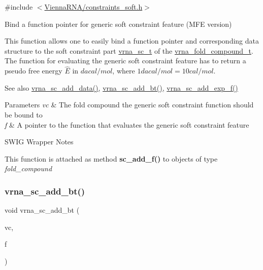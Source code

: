{\ttfamily \#include $<$\mbox{\hyperlink{constraints__soft_8h}{Vienna\+R\+N\+A/constraints\+\_\+soft.\+h}}$>$}



Bind a function pointer for generic soft constraint feature (M\+FE version) 

This function allows one to easily bind a function pointer and corresponding data structure to the soft constraint part \mbox{\hyperlink{group__soft__constraints_ga75401ce219ef8dbcceb672db82d434c6}{vrna\+\_\+sc\+\_\+t}} of the \mbox{\hyperlink{group__fold__compound_ga1b0cef17fd40466cef5968eaeeff6166}{vrna\+\_\+fold\+\_\+compound\+\_\+t}}. The function for evaluating the generic soft constraint feature has to return a pseudo free energy $ \hat{E} $ in $ dacal/mol $, where $ 1 dacal/mol = 10 cal/mol $.

\begin{DoxySeeAlso}{See also}
\mbox{\hyperlink{group__soft__constraints_ga15c6d52471ec97897e2bb7f964f5deb6}{vrna\+\_\+sc\+\_\+add\+\_\+data()}}, \mbox{\hyperlink{group__soft__constraints_gabde7d07a79bb9a8f4721aee247b674ea}{vrna\+\_\+sc\+\_\+add\+\_\+bt()}}, \mbox{\hyperlink{group__soft__constraints_ga87e382b5d0c9b7d9ce1b79c0473ff700}{vrna\+\_\+sc\+\_\+add\+\_\+exp\+\_\+f()}}
\end{DoxySeeAlso}

\begin{DoxyParams}{Parameters}
{\em vc} & The fold compound the generic soft constraint function should be bound to \\
\hline
{\em f} & A pointer to the function that evaluates the generic soft constraint feature\\
\hline
\end{DoxyParams}
\begin{DoxyRefDesc}{S\+W\+I\+G Wrapper Notes}
\item[\mbox{\hyperlink{wrappers__wrappers000022}{S\+W\+I\+G Wrapper Notes}}]This function is attached as method {\bfseries sc\+\_\+add\+\_\+f()} to objects of type {\itshape fold\+\_\+compound} \end{DoxyRefDesc}
\mbox{\label{group__soft__constraints_gabde7d07a79bb9a8f4721aee247b674ea}} 
\subsubsection{\texorpdfstring{vrna\+\_\+sc\+\_\+add\+\_\+bt()}{vrna\_sc\_add\_bt()}}
{\footnotesize\ttfamily void vrna\+\_\+sc\+\_\+add\+\_\+bt (\begin{DoxyParamCaption}\item[{\mbox{\hyperlink{group__fold__compound_ga1b0cef17fd40466cef5968eaeeff6166}{vrna\+\_\+fold\+\_\+compound\+\_\+t}} $\ast$}]{vc,  }\item[{\mbox{\hyperlink{group__soft__constraints_gaeb6448da6c593d4c489c7fbadcb99499}{vrna\+\_\+callback\+\_\+sc\+\_\+backtrack}} $\ast$}]{f }\end{DoxyParamCaption})}



